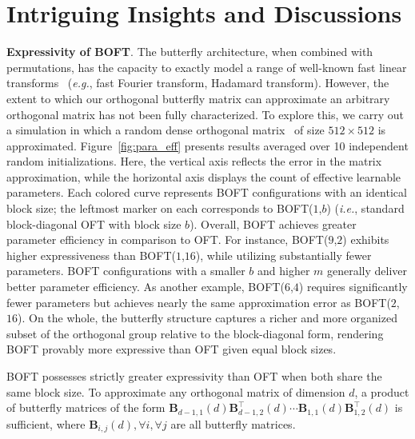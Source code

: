 \section{Intriguing Insights and Discussions}

\textbf{Expressivity of BOFT}. The butterfly architecture, when combined with permutations, has the capacity to exactly model a range of well-known fast linear transforms~\cite{dao2019learning,dao2019kaleidoscope} (\emph{e.g.}, fast Fourier transform, Hadamard transform). However, the extent to which our orthogonal butterfly matrix can approximate an arbitrary orthogonal matrix has not been fully characterized. To explore this, we carry out a simulation in which a random dense orthogonal matrix~\cite{anderson1987generation} of size $512\times 512$ is approximated. Figure~\ref{fig:para_eff} presents results averaged over 10 independent random initializations. Here, the vertical axis reflects the error in the matrix approximation, while the horizontal axis displays the count of effective learnable parameters. Each colored curve represents BOFT configurations with an identical block size; the leftmost marker on each corresponds to BOFT($1$,$b$) (\emph{i.e.}, standard block-diagonal OFT with block size $b$). Overall, BOFT achieves greater parameter efficiency in comparison to OFT. For instance, BOFT($9$,$2$) exhibits higher expressiveness than BOFT($1$,$16$), while utilizing substantially fewer parameters. BOFT configurations with a smaller $b$ and higher $m$ generally deliver better parameter efficiency. As another example, BOFT($6$,$4$) requires significantly fewer parameters but achieves nearly the same approximation error as BOFT($2$,$16$). On the whole, the butterfly structure captures a richer and more organized subset of the orthogonal group relative to the block-diagonal form, rendering BOFT provably more expressive than OFT given equal block sizes.

\begin{theorem}\label{thm:exp_boft}
    BOFT possesses strictly greater expressivity than OFT when both share the same block size. To approximate any orthogonal matrix of dimension $d$, a product of butterfly matrices of the form $\bm{B}_{d-1,1}(d)\bm{B}^\top_{d-1,2}(d)\cdots\bm{B}_{1,1}(d)\bm{B}^\top_{1,2}(d)$ is sufficient, where $\bm{B}_{i,j}(d), \forall i, \forall j$ are all butterfly matrices.
\end{theorem}

